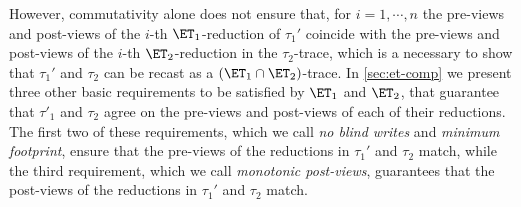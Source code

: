 However, commutativity alone does not ensure that, for $i=1,\cdots,n$ the 
pre-views and post-views of the $i$-th $\ET_1$-reduction of $\tau_1'$ 
coincide with the pre-views and post-views of the $i$-th 
$\ET_2$-reduction in the $\tau_2$-trace, which is a necessary to show 
that $\tau_1'$ and $\tau_2$ can be recast as a $(\ET_1 \cap \ET_2)$-trace. 
In \cref{sec:et-comp} we present three other basic requirements to be 
satisfied by $\ET_1$ and $\ET_2$, that guarantee that $\tau'_1$ and 
$\tau_2$ agree on the pre-views and post-views of each of their reductions. 
The first two of these requirements, which we call 
\emph{no blind writes} and \emph{minimum footprint}, ensure that 
the pre-views of the reductions in $\tau_1'$ and $\tau_2$ match, 
while the third requirement, which we call \emph{monotonic post-views}, 
guarantees that the post-views of the reductions in $\tau_1'$ and $\tau_2$ 
match. 
%
%
%
%
